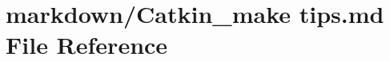 \hypertarget{Catkin__make_01tips_8md}{\section{markdown/\-Catkin\-\_\-make tips.\-md File Reference}
\label{Catkin__make_01tips_8md}
}
